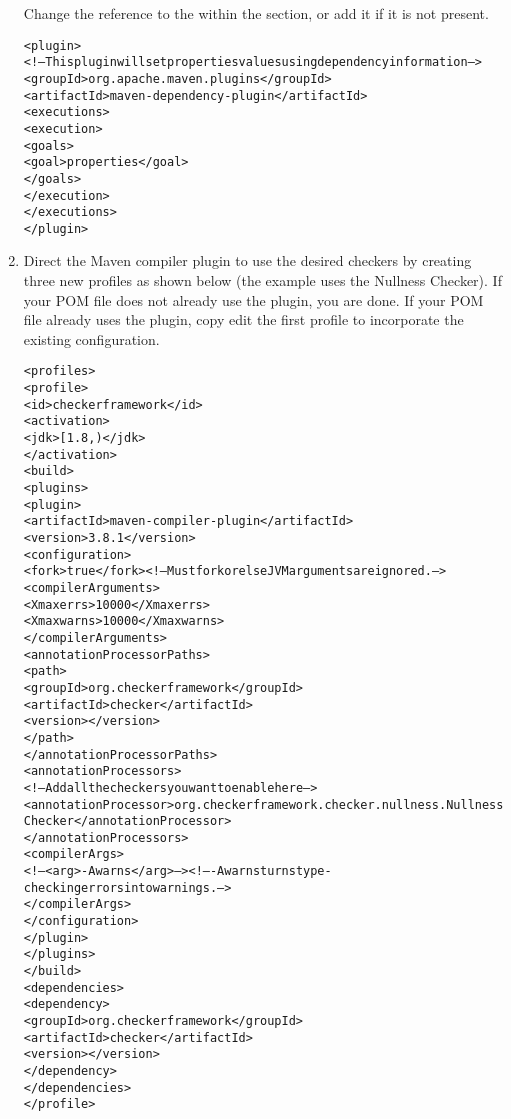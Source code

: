 \begin{enumerate}
Change the reference to the  within the 
section, or add it if it is not present.

\begin{alltt}
  <plugin>
    <!-- This plugin will set properties values using dependency information -->
    <groupId>org.apache.maven.plugins</groupId>
    <artifactId>maven-dependency-plugin</artifactId>
    <executions>
      <execution>
        <goals>
          <goal>properties</goal>
        </goals>
      </execution>
    </executions>
  </plugin>
\end{alltt}

\item Direct the Maven compiler plugin to use the desired checkers by
  creating three new profiles as shown below (the example uses the Nullness
  Checker).  If your POM file does not already use the
   plugin, you are done.  If your POM file
  already uses the plugin, copy edit the first profile to incorporate the
  existing configuration.


\begin{mysmall}
\begin{alltt}
  <profiles>
    <profile>
      <id>checkerframework</id>
      <activation>
        <jdk>[1.8,)</jdk>
      </activation>
      <build>
        <plugins>
          <plugin>
            <artifactId>maven-compiler-plugin</artifactId>
            <version>3.8.1</version>
            <configuration>
              <fork>true</fork> <!-- Must fork or else JVM arguments are ignored. -->
              <compilerArguments>
                <Xmaxerrs>10000</Xmaxerrs>
                <Xmaxwarns>10000</Xmaxwarns>
              </compilerArguments>
              <annotationProcessorPaths>
                <path>
                  <groupId>org.checkerframework</groupId>
                  <artifactId>checker</artifactId>
                  <version>\ReleaseVersion{}</version>
                </path>
              </annotationProcessorPaths>
              <annotationProcessors>
                <!-- Add all the checkers you want to enable here -->
                <annotationProcessor>org.checkerframework.checker.nullness.NullnessChecker</annotationProcessor>
              </annotationProcessors>
              <compilerArgs>
                <!-- <arg>-Awarns</arg> --> <!-- -Awarns turns type-checking errors into warnings. -->
              </compilerArgs>
            </configuration>
          </plugin>
        </plugins>
      </build>
      <dependencies>
        <dependency>
          <groupId>org.checkerframework</groupId>
          <artifactId>checker</artifactId>
          <version>\ReleaseVersion{}</version>
        </dependency>
      </dependencies>
    </profile>


\end{alltt}
\end{mysmall}
\end{enumerate}
